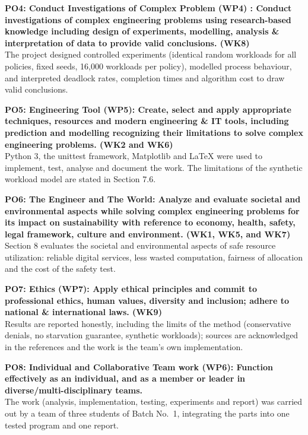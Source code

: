 \documentclass[11pt,a4paper]{report}
\begin{document}
\bigskip
\noindent\textbf{PO4: Conduct Investigations of Complex Problem (WP4) : Conduct investigations of complex engineering problems using research-based knowledge including design of experiments, modelling, analysis \& interpretation of data to provide valid conclusions. (WK8)}\\
The project designed controlled experiments (identical random workloads for all policies, fixed seeds, 16{,}000 workloads per policy), modelled process behaviour, and interpreted deadlock rates, completion times and algorithm cost to draw valid conclusions.

\bigskip
\noindent\textbf{PO5: Engineering Tool  (WP5): Create, select and apply appropriate techniques, resources and modern engineering \& IT tools, including prediction and modelling recognizing their limitations to solve complex engineering problems. (WK2 and WK6)}\\
Python 3, the unittest framework, Matplotlib and \LaTeX{} were used to implement, test, analyse and document the work. The limitations of the synthetic workload model are stated in Section 7.6.

\bigskip
\noindent\textbf{PO6: The Engineer and The World: Analyze and evaluate societal and environmental aspects while solving complex engineering problems for its impact on sustainability with reference to economy, health, safety, legal framework, culture and environment. (WK1, WK5, and WK7)}\\
Section 8 evaluates the societal and environmental aspects of safe resource utilization: reliable digital services, less wasted computation, fairness of allocation and the cost of the safety test.

\bigskip
\noindent\textbf{PO7: Ethics (WP7): Apply ethical principles and commit to professional ethics, human values, diversity and inclusion; adhere to national \& international laws. (WK9)}\\
Results are reported honestly, including the limits of the method (conservative denials, no starvation guarantee, synthetic workloads); sources are acknowledged in the references and the work is the team's own implementation.

\bigskip
\noindent\textbf{PO8: Individual and Collaborative Team work (WP6): Function effectively as an individual, and as a member or leader in diverse/multi-disciplinary teams.}\\
The work (analysis, implementation, testing, experiments and report) was carried out by a team of three students of Batch No.~1, integrating the parts into one tested program and one report.
\end{document}
